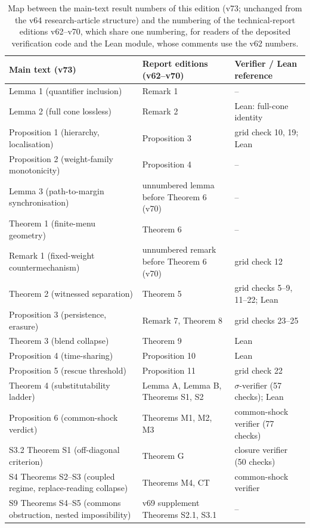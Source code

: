 \documentclass[preprint,11pt,authoryear]{elsarticle}
\theoremstyle{remark}
\begin{document}
\begin{table}[!htbp]
\centering\small
\caption{Map between the main-text result numbers of this edition (v73; unchanged from the v64 research-article structure) and the numbering of the technical-report editions v62--v70, which share one numbering, for readers of the deposited verification code and the Lean module, whose comments use the v62 numbers.}
\begin{tabularx}{\textwidth}{@{}>{\raggedright\arraybackslash}p{}>{\raggedright\arraybackslash}p{}X@{}}
\toprule
Main text (v73) & Report editions (v62--v70) & Verifier / Lean reference \\
\midrule
Lemma 1 (quantifier inclusion) & Remark 1 & -- \\
Lemma 2 (full cone lossless) & Remark 2 & Lean: full-cone identity \\
Proposition 1 (hierarchy, localisation) & Proposition 3 & grid check 10, 19; Lean \\
Proposition 2 (weight-family monotonicity) & Proposition 4 & -- \\
Lemma 3 (path-to-margin synchronisation) & unnumbered lemma before Theorem 6 (v70) & -- \\
Theorem 1 (finite-menu geometry) & Theorem 6 & -- \\
Remark 1 (fixed-weight countermechanism) & unnumbered remark before Theorem 6 (v70) & grid check 12 \\
Theorem 2 (witnessed separation) & Theorem 5 & grid checks 5--9, 11--22; Lean \\
Proposition 3 (persistence, erasure) & Remark 7, Theorem 8 & grid checks 23--25 \\
Theorem 3 (blend collapse) & Theorem 9 & Lean \\
Proposition 4 (time-sharing) & Proposition 10 & Lean \\
Proposition 5 (rescue threshold) & Proposition 11 & grid check 22 \\
Theorem 4 (substitutability ladder) & Lemma A, Lemma B, Theorems S1, S2 & $\sigma$-verifier (57 checks); Lean \\
Proposition 6 (common-shock verdict) & Theorems M1, M2, M3 & common-shock verifier (77 checks) \\
S3.2 Theorem S1 (off-diagonal criterion) & Theorem G & closure verifier (50 checks) \\
S4 Theorems S2--S3 (coupled regime, replace-reading collapse) & Theorems M4, CT & common-shock verifier \\
S9 Theorems S4--S5 (commons obstruction, nested impossibility) & v69 supplement Theorems S2.1, S3.1 & -- \\
\bottomrule
\end{tabularx}
\end{table}
\end{document}
